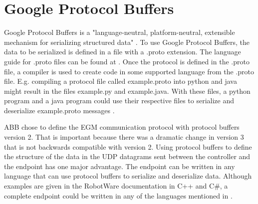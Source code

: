 \documentclass{cslthse-msc}
\begin{document}
\section{Google Protocol Buffers}
\label{sec:Tech_Back:GPB}
Google Protocol Buffers is a "language-neutral, platform-neutral, extensible mechanism for serializing structured data" \cite{Google:Proto_Start}. To use Google Protocol Buffers, the data to be serialized is defined in a file with a .proto extension. The language guide for .proto files can be found at \cite{Google:Proto_v2_guide}. Once the protocol is defined in the .proto file, a compiler is used to create code in some supported language from the .proto file. E.g. compiling a protocol file called example.proto into python and java might result in the files example.py and example.java. With these files, a python program and a java program could use their respective files to serialize and deserialize example.proto messages \cite{Google:Proto_Api}.\par

ABB chose to define the EGM communication protocol with protocol buffers version 2. That is important because there was a dramatic change in version 3 that is not backwards compatible with version 2. Using protocol buffers to define the structure of the data in the UDP datagrams sent between the controller and the endpoint has one major advantage. The endpoint can be written in any language that can use protocol buffers to serialize and deserialize data. Although examples are given in the RobotWare documentation in C++ and C\#, a complete endpoint could be written in any of the languages mentioned in \cite{Google:Proto_Other}.
\end{document}
